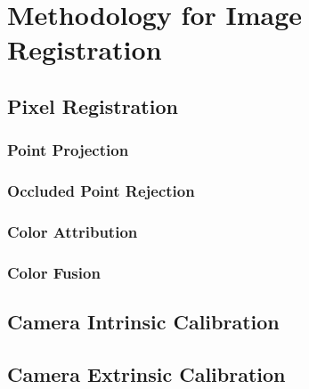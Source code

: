\chapter{Methodology for Image Registration}
\label{section:methodology-for-image-registration}

\section{Pixel Registration}
\label{section:pixel-registration}

\subsection{Point Projection}
\label{section:point-projection}

\subsection{Occluded Point Rejection}
\label{section:occluded-point-rejection}

\subsection{Color Attribution}
\label{section:color-attribution}

\subsection{Color Fusion}

\section{Camera Intrinsic Calibration}
\label{section:camera-intrinsic-calibration}

\section{Camera Extrinsic Calibration}
\label{section:camera-extrinsic-calibration}
